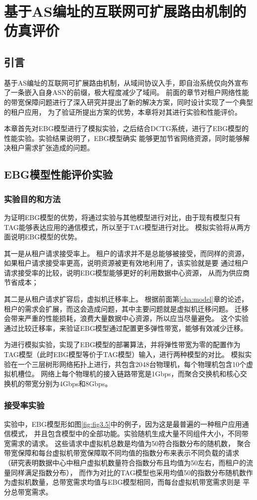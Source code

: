 

\chapter{基于AS编址的互联网可扩展路由机制的仿真评价}
\label{simu}
\section{引言}
基于AS编址的互联网可扩展路由机制，从域间协议入手，即自治系统仅向外宣布了一条嵌入自身ASN的前缀，极大程度减少了域间。
前面的章节对租户网络性能的带宽保障问题进行了深入研究并提出了新的解决方案，同时设计实现了一个典型的租户应用，
为了验证所提出方案的优势，本章将对其进行实验和性能评价。

本章首先对EBG模型进行了模拟实验，之后结合DCTG系统，进行了EBG模型的性能实验。实验结果说明了，EBG模型确实
能够更加节省网络资源，同时能够解决租户需求扩张造成的问题。

\section{EBG模型性能评价实验}
\subsection{实验目的和方法}
为证明EBG模型的优势，将通过实验与其他模型进行对比，由于现有模型只有TAG能够表达应用的通信模式，所以至于TAG模型进行对比。
模拟实验将从两方面说明EBG模型的优势。

其一是从租户请求接受率上。
租户的请求并不是总能够被接受，而同样的资源，如果租户请求接受率更高，说明资源被更有效地利用了，该实验就是要
通过租户请求接受率的比较，说明EBG模型能够更好的利用数据中心资源，
从而为供应商节省成本；

其二是从租户请求扩容后，虚拟机迁移率上。
根据前面第\ref{cha:model}章的论述，租户的需求会扩展，而这会造成问题，其中主要问题就是虚拟机迁移问题。
迁移会带来严重的性能损耗，浪费大量数据中心资源，所以应当尽量避免。
这个实验通过比较迁移率，来验证EBG模型通过配置更多弹性带宽，能够有效减少迁移。

为进行模拟实验，实现了EBG模型的部署算法，并将弹性带宽为零的配置作为TAG模型（此时EBG模型等价于TAG模型）输入，进行两种模型的对比。
模拟实验在一个三层树形网络拓扑上进行，共包含2048台物理机，每个物理机包含10个虚拟机槽位。
网络上每个物理机的接入链路带宽是1Gbps，而聚合交换机和核心交换机的带宽分别为4Gbps和8Gbps。

\subsection{接受率实验}
实验中，EBG模型形如图\ref{fig:fig3.5}中的例子，因为这是最普遍的一种租户应用通信模式，
并且包含模型中的全部功能。实验随机生成大量不同组件大小，不同带宽需求的请求。
这些请求中虚拟机总数是均值为50符合指数分布的随机数，
聚合带宽保障和每台虚拟机带宽保障取不同均值的指数分布来表示不同负载的请求
（研究表明数据中心中租户虚拟机数量符合指数分布且均值为50左右，而租户的流量同样满足指数分布\cite{shieh2011sharing}），
而作为对比的TAG模型也采用均值50的指数分布随机数作为虚拟机数量，总带宽需求均值与EBG模型相同，而每台虚拟机带宽需求则是
平分总带宽需求。

